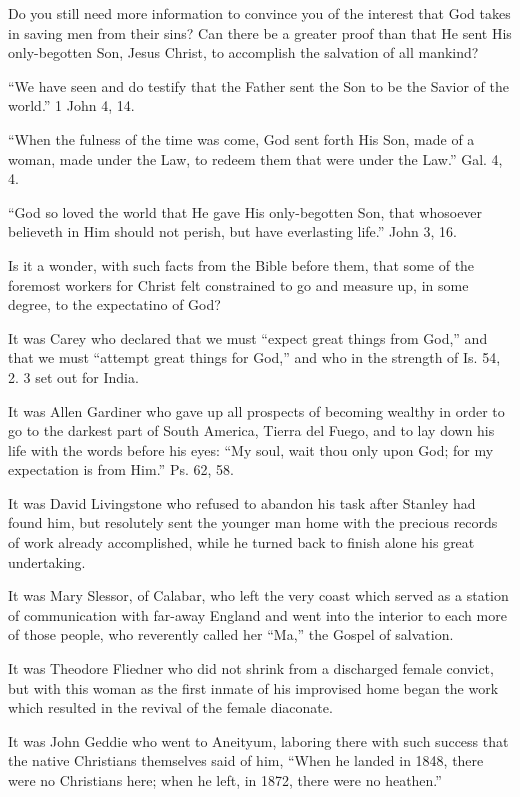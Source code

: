 \documentclass[
]{book}
\begin{document}
Do you still need more information to convince you of the interest that God takes in saving men from their sins? Can there be a greater proof than that He sent His only-begotten Son, Jesus Christ, to accomplish the salvation of all mankind?

``We have seen and do testify that the Father sent the Son to be the Savior of the world.'' 1 John 4, 14.

``When the fulness of the time was come, God sent forth His Son, made of a woman, made under the Law, to redeem them that were under the Law.'' Gal. 4, 4.

``God so loved the world that He gave His only-begotten Son, that whosoever believeth in Him should not perish, but have everlasting life.'' John 3, 16.

Is it a wonder, with such facts from the Bible before them, that some of the foremost workers for Christ felt constrained to go and measure up, in some degree, to the expectatino of God?

It was Carey who declared that we must ``expect great things from God,'' and that we must ``attempt great things for God,'' and who in the strength of Is. 54, 2. 3 set out for India.

It was Allen Gardiner who gave up all prospects of becoming wealthy in order to go to the darkest part of South America, Tierra del Fuego, and to lay down his life with the words before his eyes: ``My soul, wait thou only upon God; for my expectation is from Him.'' Ps. 62, 58.

It was David Livingstone who refused to abandon his task after Stanley had found him, but resolutely sent the younger man home with the precious records of work already accomplished, while he turned back to finish alone his great undertaking.

It was Mary Slessor, of Calabar, who left the very coast which served as a station of communication with far-away England and went into the interior to each more of those people, who reverently called her ``Ma,'' the Gospel of salvation.

It was Theodore Fliedner who did not shrink from a discharged female convict, but with this woman as the first inmate of his improvised home began the work which resulted in the revival of the female diaconate.

It was John Geddie who went to Aneityum, laboring there with such success that the native Christians themselves said of him, ``When he landed in 1848, there were no Christians here; when he left, in 1872, there were no heathen.''
\end{document}
